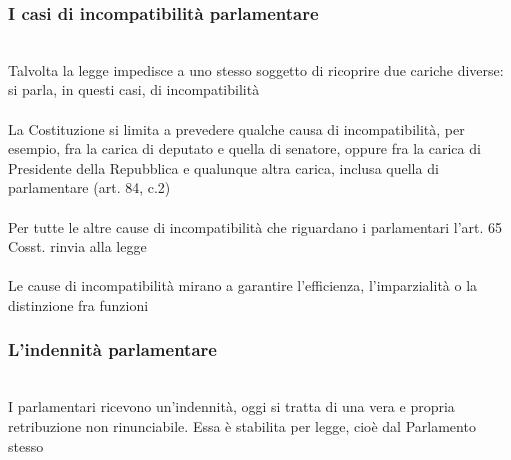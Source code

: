 \documentclass{report}
\begin{document}
\subsubsection{I casi di incompatibilità parlamentare}
\\
Talvolta la legge impedisce a uno stesso soggetto di ricoprire due cariche diverse: si parla, in questi casi, di incompatibilità 
\\
\\
La Costituzione si limita a prevedere qualche causa di incompatibilità, per esempio, fra la carica di deputato e quella di senatore, oppure fra la carica di Presidente della Repubblica e qualunque altra carica, inclusa quella di parlamentare (art. 84, c.2)
\\
\\
Per tutte le altre cause di incompatibilità che riguardano i parlamentari l'art. 65 Cosst. rinvia alla legge
\\
\\
Le cause di incompatibilità mirano a garantire l'efficienza, l'imparzialità o la distinzione fra funzioni
\\
\subsubsection{L'indennità parlamentare}
\\
I parlamentari ricevono un'indennità, oggi si tratta di una vera e propria retribuzione non rinunciabile. Essa è stabilita per legge, cioè dal Parlamento stesso
\\
\end{document}
